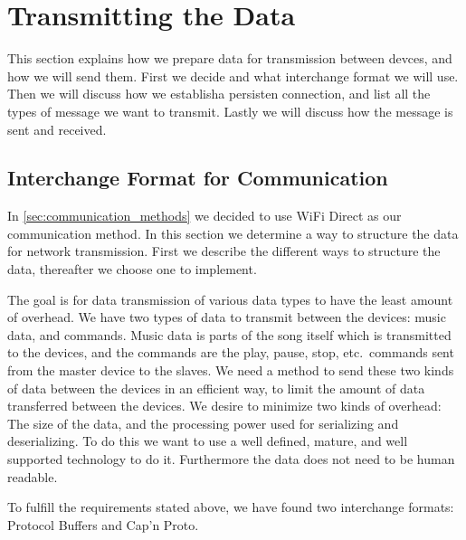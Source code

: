 \section{Transmitting the Data}\label{sec:transmitting_the_data}
This section explains how we prepare data for transmission between devces, and how we will send them.
First we decide and what interchange format we will use.
Then we will discuss how we establisha persisten connection, and list all the types of message we want to transmit.
Lastly we will discuss how the message is sent and received.

\subsection{Interchange Format for Communication}\label{sec:transmit}
In \cref{sec:communication_methods} we decided to use WiFi Direct as our communication method.
In this section we determine a way to structure the data for network transmission.
First we describe the different ways to structure the data, thereafter we choose one to implement.

\bigskip
The goal is for data transmission of various data types to have the least amount of overhead.
We have two types of data to transmit between the devices: music data, and commands.
Music data is parts of the song itself which is transmitted to the devices,
and the commands are the play, pause, stop, etc.\ commands sent from the master device to the slaves.
We need a method to send these two kinds of data between the devices in an efficient way,
to limit the amount of data transferred between the devices.
We desire to minimize two kinds of overhead: The size of the data, and the processing power used for serializing and deserializing.
To do this we want to use a well defined, mature, and well supported technology to do it.
Furthermore the data does not need to be human readable.

\bigskip
To fulfill the requirements stated above, we have found two interchange formats: Protocol Buffers and Cap'n Proto.

